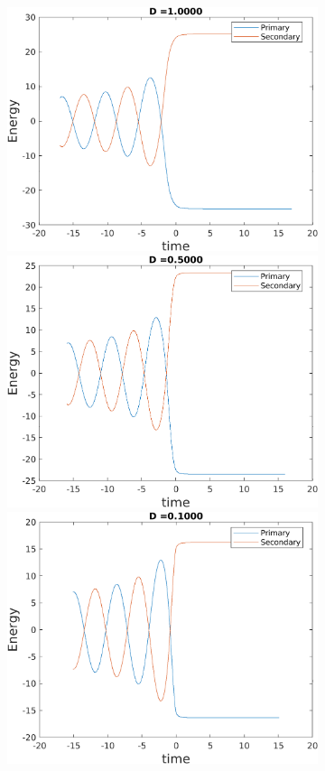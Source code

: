 \documentclass[a4paper]{article}
\begin{document}
\begin{enumerate} [label*=\textbf{(\alph*)}]
\begin{figure} [h]
\begin{subfigure} {.425\linewidth}
					\end{subfigure} %
					\hspace{1.7cm}
					\begin{subfigure} {.425\linewidth}
						\includegraphics[width=\linewidth, height =.55\linewidth] {../plots/3f/prograde_energies/6.png}\\
						\vspace{1.5mm}
						\includegraphics[width=\linewidth, height =.55\linewidth] {../plots/3f/prograde_energies/5.png}\\
						\vspace{1.5mm}
						\includegraphics[width=\linewidth, height =.55\linewidth] {../plots/3f/prograde_energies/4.png}\\

\end{subfigure}
\end{figure}
\end{enumerate}
\end{document}
